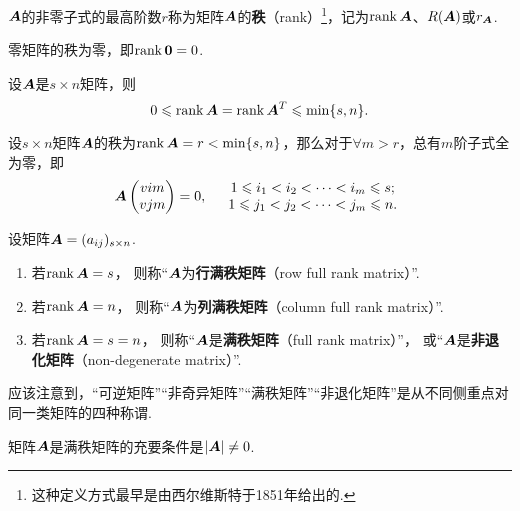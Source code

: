 \begin{definition}\label{definition:线性方程组.矩阵的秩的定义}
\(\boldsymbol{A}\)的非零子式的最高阶数\(r\)称为矩阵\(\boldsymbol{A}\)的\textbf{秩}（rank）\footnote{这种定义方式最早是由西尔维斯特于1851年给出的.}，记为\(\rank\boldsymbol{A}\)、\(R(\boldsymbol{A})\)或\(r_{\boldsymbol{A}}\).
\end{definition}

\begin{property}\label{theorem:线性方程组.矩阵的秩的性质1}
零矩阵的秩为零，即\(\rank\boldsymbol{0} = 0\).
\end{property}

\begin{property}\label{theorem:线性方程组.矩阵的秩的性质2}
设\(\boldsymbol{A}\)是\(s \times n\)矩阵，则\[
0 \leqslant \rank\boldsymbol{A} = \rank\boldsymbol{A}^T \leqslant \min\{s,n\}.
\]
\end{property}

\begin{property}\label{theorem:线性方程组.矩阵的秩的性质3}
设\(s \times n\)矩阵\(\boldsymbol{A}\)的秩为\(\rank\boldsymbol{A} = r < \min\{s,n\}\)，那么对于\(\forall m > r\)，总有\(m\)阶子式全为零，即\[
\boldsymbol{A}\begin{pmatrix}
v{i}{m} \\
v{j}{m}
\end{pmatrix} = 0,
\quad\begin{array}{c}
1 \leqslant i_1 < i_2 < \dotsb < i_m \leqslant s; \\
1 \leqslant j_1 < j_2 < \dotsb < j_m \leqslant n.
\end{array}
\]
\end{property}

\begin{definition}
设矩阵\(\boldsymbol{A} = (a_{ij})_{s \times n}\).
\begin{enumerate}
	\item 若\(\rank\boldsymbol{A} = s\)，
	则称“\(\boldsymbol{A}\)为\textbf{行满秩矩阵}（row full rank matrix）”.
	\item 若\(\rank\boldsymbol{A} = n\)，
	则称“\(\boldsymbol{A}\)为\textbf{列满秩矩阵}（column full rank matrix）”.
	\item 若\(\rank\boldsymbol{A} = s = n\)，
	则称“\(\boldsymbol{A}\)是\textbf{满秩矩阵}（full rank matrix）”，
	或“\(\boldsymbol{A}\)是\textbf{非退化矩阵}（non-degenerate matrix）”.
\end{enumerate}
\end{definition}

应该注意到，“可逆矩阵”“非奇异矩阵”“满秩矩阵”“非退化矩阵”是从不同侧重点对同一类矩阵的四种称谓.

\begin{property}\label{theorem:线性方程组.矩阵的秩的性质4}
矩阵\(\boldsymbol{A}\)是满秩矩阵的充要条件是\(\abs{\boldsymbol{A}}\neq0\).
\end{property}

